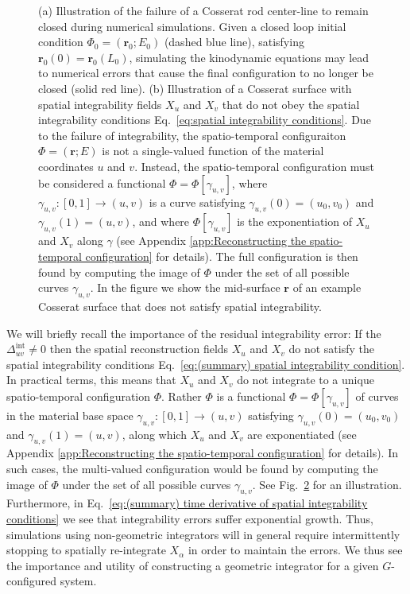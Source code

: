 \begin{figure}
\begin{subfigure}[b]{0.47\textwidth}
        \caption[]%
        {}    
        \label{fig:surface spatial integrability err}
    \end{subfigure}
    \caption[ ]
    {\small (a) Illustration of the failure of a Cosserat rod center-line to remain closed during numerical simulations. Given a closed loop initial condition $\Phi_0 = (\mathbf{r}_0 ; E_0)$ (dashed blue line), satisfying $\mathbf{r}_0(0) = \mathbf{r}_0(L_0)$, simulating the kinodynamic equations may lead to numerical errors that cause the final configuration to no longer be closed (solid red line). (b) Illustration of a Cosserat surface with spatial integrability fields $X_u$ and $X_v$ that do not obey the spatial integrability conditions Eq.~\ref{eq:spatial integrability conditions}. Due to the failure of integrability, the spatio-temporal configuraiton $\Phi = (\mathbf{r} ; E)$ is not a single-valued function of the material coordinates $u$ and $v$. Instead, the spatio-temporal configuration must be considered a functional $\Phi = \Phi[\gamma_{u,v}]$, where $\gamma_{u,v} : [0,1] \to (u,v)$ is a curve satisfying $\gamma_{u,v}(0) = (u_0, v_0)$ and $\gamma_{u,v}(1) = (u,v)$, and where $\Phi[\gamma_{u,v}]$ is the exponentiation of $X_u$ and $X_v$ along $\gamma$  (see Appendix \ref{app:Reconstructing the spatio-temporal configuration} for details). The full configuration is then found by computing the image of $\Phi$ under the set of all possible curves $\gamma_{u,v}$. In the figure we show the mid-surface $\mathbf{r}$ of an example Cosserat surface that does not satisfy spatial integrability.}
\end{figure} 

 We will briefly recall the importance of the residual integrability error: If the $\Delta^\text{int}_{u v} \neq 0$ then the spatial reconstruction fields $X_u$ and $X_v$ do not satisfy the spatial integrability conditions Eq.~\ref{eq:(summary) spatial integrability condition}. In practical terms, this means that $X_u$ and $X_v$ do not integrate to a unique spatio-temporal configuration $\Phi$. Rather $\Phi$ is a functional $\Phi = \Phi[\gamma_{u,v}]$ of curves in the material base space $\gamma_{u,v} : [0,1] \to (u,v)$ satisfying $\gamma_{u,v}(0) = (u_0, v_0)$ and $\gamma_{u,v}(1) = (u,v)$, along which $X_u$ and $X_v$ are exponentiated (see Appendix \ref{app:Reconstructing the spatio-temporal configuration} for details). In such cases, the multi-valued configuration would be found by computing the image of $\Phi$ under the set of all possible curves $\gamma_{u,v}$. See Fig.~\ref{fig:surface spatial integrability err} for an illustration. Furthermore, in Eq.~\ref{eq:(summary) time derivative of spatial integrability conditions} we see that integrability errors suffer exponential growth. Thus, simulations using non-geometric integrators will in general require intermittently stopping to spatially re-integrate $X_\alpha$ in order to maintain the errors. We thus see the importance and utility of constructing a geometric integrator for a given $G$-configured system.
 

